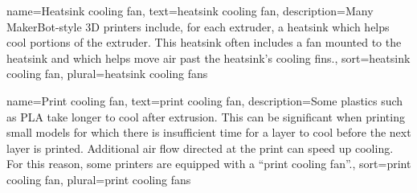 {
        name={Heatsink cooling fan},
        text={heatsink cooling fan},
        description={Many MakerBot-style 3D printers include, for each extruder, a heatsink which helps cool portions of the extruder.  This heatsink often includes a fan mounted to the heatsink and which helps move air past the heatsink's cooling fins.},
        sort={heatsink cooling fan},
        plural={heatsink cooling fans}
}

{
        name={Print cooling fan},
        text={print cooling fan},
        description={Some plastics such as PLA take longer to cool after extrusion.  This can be significant when printing small models for which there is insufficient time for a layer to cool before the next layer is printed.  Additional air flow directed at the print can speed up cooling.  For this reason, some printers are equipped with a ``print cooling fan''.},
        sort={print cooling fan},
        plural={print cooling fans}
}